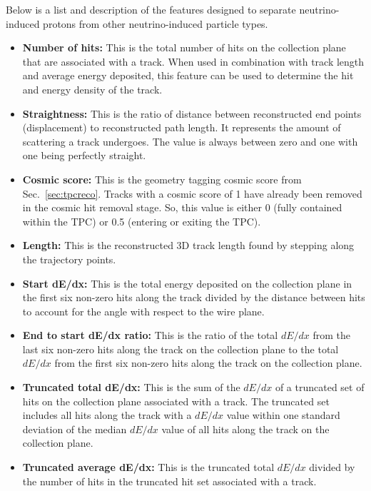     Below is a list and description of the features designed to separate
    neutrino-induced protons from other neutrino-induced particle types.
    \begin{itemize}
      \item \textbf{Number of hits:} This is the total number of hits on the
      collection plane that are associated with a track. When used in
      combination with track length and average energy deposited, this feature
      can be used to determine the hit and energy density of the track.
      \item \textbf{Straightness:} This is the ratio of distance between
      reconstructed end points (displacement) to reconstructed path length. It
      represents the amount of scattering a track undergoes. The value is
      always between zero and one with one being perfectly straight.
      \item \textbf{Cosmic score:} This is the geometry tagging cosmic score
      from Sec.~\ref{sec:tpcreco}. Tracks with a cosmic score of 1 have already
      been removed in the cosmic hit removal stage. So, this value is either 0
      (fully contained within the TPC) or 0.5 (entering or exiting the TPC).
      \item \textbf{Length:} This is the reconstructed 3D track length found by
      stepping along the trajectory points.
      \item \textbf{Start dE/dx:} This is the total energy deposited on the
      collection plane in the first six non-zero hits along the track divided
      by the distance between hits to account for the angle with respect to the
      wire plane.
      \item \textbf{End to start dE/dx ratio:} This is the ratio of the total
      $dE/dx$ from the last six non-zero hits along the track on the collection
      plane to the total $dE/dx$ from the first six non-zero hits along the
      track on the collection plane.
      \item \textbf{Truncated total dE/dx:} This is the sum of the $dE/dx$ of a
      truncated set of hits on the collection plane associated with a track.
      The truncated set includes all hits along the track with a $dE/dx$ value
      within one standard deviation of the median $dE/dx$ value of all hits
      along the track on the collection plane.
      \item \textbf{Truncated average dE/dx:} This is the truncated total
      $dE/dx$ divided by the number of hits in the truncated hit set associated
      with a track.
    \end{itemize}

